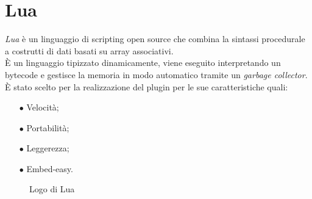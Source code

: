 \section{Lua}\label{sec:lua}
\emph{Lua} è un linguaggio di scripting open source che combina la sintassi procedurale a costrutti di dati basati su array associativi.\\
È un linguaggio tipizzato dinamicamente, viene eseguito interpretando un bytecode e gestisce la memoria in modo automatico tramite un \emph{garbage collector}. \cite{Lua}\\
È stato scelto per la realizzazione del plugin per le sue caratteristiche quali:
\begin{itemize}
	\item[$\bullet$]Velocità;
	\item[$\bullet$]Portabilità;
	\item[$\bullet$]Leggerezza;
	\item[$\bullet$]Embed-easy.
\end{itemize}
\begin{figure}[ht]
	\centering
	\caption{Logo di Lua}
	\label{fig:one}
\end{figure}
\newpage
